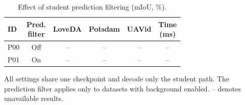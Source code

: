 \begin{table}[!tb]
\centering
\caption{Effect of student prediction filtering (mIoU, \%).}
\label{tab:postprocess_gates}
\small
\setlength{\tabcolsep}{2pt}
\begin{tabular}{lccccc}
\toprule
ID & \shortstack{Pred.\\filter} & LoveDA & Potsdam & UAVid & \shortstack{Time\\(ms)}\\
\midrule
P00 & Off & -- & -- & -- & --\\
P01 & On & -- & -- & -- & --\\
\bottomrule
\end{tabular}
\par\vspace{3pt}
\begin{minipage}{\columnwidth}
\footnotesize All settings share one checkpoint and decode only the student path. The prediction filter applies only to datasets with background enabled. -- denotes unavailable results.
\end{minipage}
\end{table}
